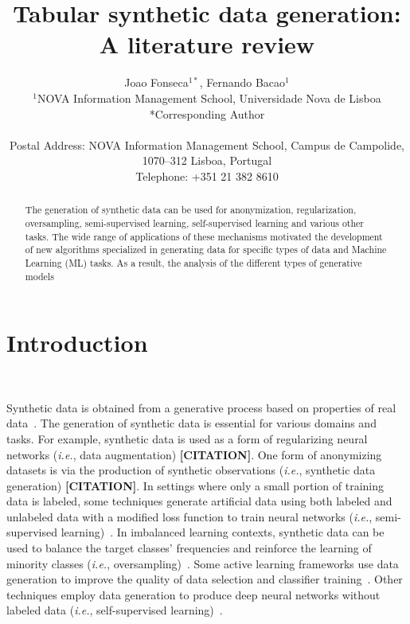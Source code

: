 \documentclass[parskip=full]{scrartcl}
\title{Tabular synthetic data generation: A literature review}
\author{%
	Joao Fonseca\(^{1*}\), Fernando Bacao\(^{1}\)
	\\
	\small{\(^{1}\)NOVA Information Management School, Universidade Nova de Lisboa}
	\\
	\small{*Corresponding Author}
	\\
	\\
	\small{Postal Address: NOVA Information Management School, Campus de
    Campolide, 1070--312 Lisboa, Portugal}
	\\
	\small{Telephone: +351 21 382 8610}
}
\date{}
\begin{document}
\maketitle
\linenumbers

\begin{abstract}

    The generation of synthetic data can be used for anonymization,
    regularization, oversampling, semi-supervised learning, self-supervised
    learning and various other tasks. The wide range of applications of these
    mechanisms motivated the development of new algorithms specialized in
    generating data for specific types of data and Machine Learning (ML)
    tasks. As a result, the analysis of the different types of generative
    models 



\end{abstract}

\section{Introduction}~\label{sec:introduction}

Synthetic data is obtained from a generative process based on properties of
real data~\cite{assefa2020generating}. The generation of synthetic data is
essential for various domains and tasks. For example, synthetic data is used
as a form of regularizing neural networks (\textit{i.e.}, data augmentation)
\textbf{[CITATION]}. One form of anonymizing datasets is via the production of
synthetic observations (\textit{i.e.}, synthetic data generation)
\textbf{[CITATION]}. In settings where only a small portion of training data
is labeled, some techniques generate artificial data using both labeled and
unlabeled data with a modified loss function to train neural networks
(\textit{i.e.}, semi-supervised learning)~\cite{laine2017temporal}. In
imbalanced learning contexts, synthetic data can be used to balance the target
classes' frequencies and reinforce the learning of minority classes
(\textit{i.e.}, oversampling)~\cite{fonseca2021improving}. Some active
learning frameworks use data generation to improve the quality of data
selection and classifier training~\cite{kim2021lada}. Other techniques employ
data generation to produce deep neural networks without labeled data
(\textit{i.e.}, self-supervised learning)~\cite{grill2020bootstrap}.
\end{document}
